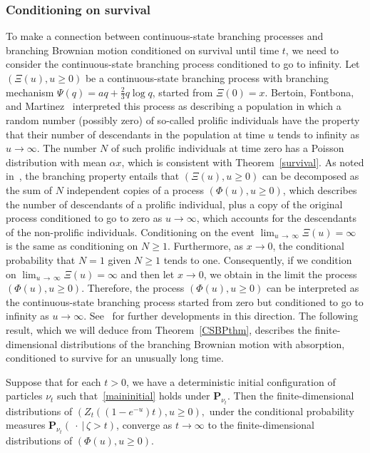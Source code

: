 \documentclass[AHL,Unicode,longabstracts,published]{cedram}
\renewcommand*\P{\mathbf{P}}
\newcommand{\1} {\mathds{1}}
\begin{document}
\subsubsection{Conditioning on survival}
To make a connection between continuous-state branching processes and branching Brownian motion conditioned on survival until time $t$, we need to consider the continuous-state branching process conditioned to go to infinity. Let $(\Xi(u), u \geq 0)$ be a continuous-state branching process with branching mechanism $\Psi(q) = aq + \frac{2}{3} q \log q$, started from $\Xi(0) = x$. Bertoin, Fontbona, and Martinez~\cite{bfm08} interpreted this process as describing a population in which a random number (possibly zero) of so-called prolific individuals have the property that their number of descendants in the population at time $u$ tends to infinity as $u \rightarrow \infty$. The number $N$ of such prolific individuals at time zero has a Poisson distribution with mean $\alpha x$, which is consistent with Theorem~\ref{survival}. As noted in~\cite[Section~3]{bfm08}, the branching property entails that $(\Xi(u), u \geq 0)$ can be decomposed as the sum of $N$ independent copies of a process $(\Phi(u), u \geq 0)$, which describes the number of descendants of a prolific individual, plus a copy of the original process conditioned to go to zero as $u \rightarrow \infty$, which accounts for the descendants of the non-prolific individuals. Conditioning on the event $\lim_{u\,\rightarrow\,\infty} \Xi(u) = \infty$ is the same as conditioning on $N \geq 1$. Furthermore, as $x \rightarrow 0$, the conditional probability that $N = 1$ given $N \geq 1$ tends to one. Consequently, if we condition on $\lim_{u\,\rightarrow\,\infty} \Xi(u) = \infty$ and then let $x \rightarrow 0$, we obtain in the limit the process $(\Phi(u), u \geq 0)$. Therefore, the process $(\Phi(u), u \geq 0)$ can be interpreted as the continuous-state branching process started from zero but conditioned to go to infinity as $u \rightarrow \infty$. See~\cite{bkm11, fm19} for further developments in this direction. The following result, which we will deduce from Theorem~\ref{CSBPthm}, describes the finite-dimensional distributions of the branching Brownian motion with absorption, conditioned to survive for an unusually long time.

\begin{theo}\label{CSBPcond}
Suppose that for each $t > 0$, we have a deterministic initial configuration of particles $\nu_t$ such that~\eqref{maininitial} holds under $\P_{\nu_t}$. Then the finite-dimensional distributions of $(Z_t((1 - e^{-u})t), u \geq 0),$ under the conditional probability measures $\P_{\nu_t}(\:\cdot\:|\,\zeta > t)$, converge as $t \rightarrow \infty$ to the finite-dimensional distributions of $(\Phi(u), u \geq 0)$.
\end{theo}
\end{document}
